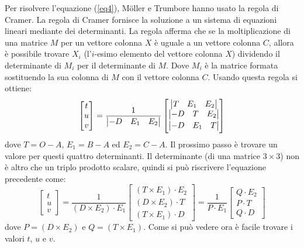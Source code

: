 Per risolvere l'equazione (\ref{eq4}), M\"oller e Trumbore hanno usato la regola di Cramer. La regola di Cramer fornisce la soluzione a un sistema di equazioni lineari mediante dei determinanti. La regola afferma che se la moltiplicazione di una matrice $M$ per un vettore colonna $X$ è uguale a un vettore colonna $C$, allora è possibile trovare $X_i$ (l'$i$-esimo elemento del vettore colonna $X$) dividendo il determinante di $M_i$ per il determinante di $M$. Dove $M_i$ è la matrice formata sostituendo la sua colonna di $M$ con il vettore colonna $C$. Usando questa regola si ottiene:
\begin{equation}
\begin{bmatrix}
t \\
u \\
v
\end{bmatrix} = 
\frac{1}{\begin{vmatrix}-D & E_1 & E_2\end{vmatrix}}
\begin{bmatrix}
\begin{vmatrix}T & E_1 & E_2\end{vmatrix} \\ \vspace{2pt}
\begin{vmatrix}-D & T & E_2\end{vmatrix} \\ \vspace{2pt}
\begin{vmatrix}-D & E_1 & T\end{vmatrix}
\end{bmatrix}
\label{eq5}
\end{equation}
dove $T=O-A$, $E_1=B-A$ ed $E_2=C-A$. Il prossimo passo è trovare un valore per questi quattro determinanti. Il determinante (di una matrice $3 \times 3$) non è altro che un triplo prodotto scalare, quindi si può riscrivere l'equazione precedente come:
\begin{equation}
\begin{bmatrix}
t \\
u \\
v
\end{bmatrix} 
= \frac{1}{(D \times E_2) \cdot E_1}
\begin{bmatrix}
(T \times E_1) \cdot E_2 \\
(D \times E_2) \cdot T \\
(T \times E_1) \cdot D
\end{bmatrix}
= \frac{1}{P \cdot E_1}
\begin{bmatrix}
Q \cdot E_2 \\
P \cdot T \\
Q \cdot D
\end{bmatrix}
\end{equation}
dove $P = (D \times E_2)$ e $Q = (T \times E_1)$. Come si può vedere ora è facile trovare i valori $t$, $u$ e $v$.

